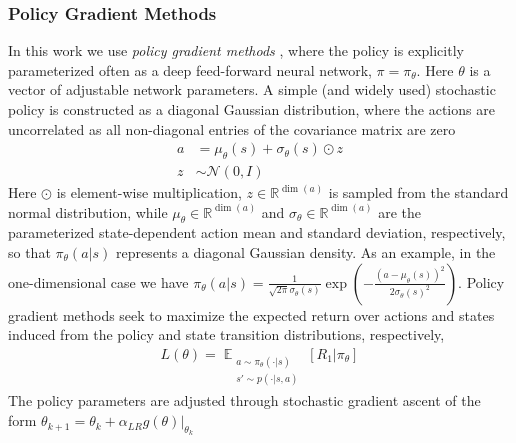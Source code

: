 \documentclass{UnderReview}
\DeclareMathOperator*{\E}{\mathbb{E}}
\begin{document}
\subsubsection{Policy Gradient Methods}\label{section:pg_methods}
In this work we use \textit{policy gradient methods} \cite{peters2006policy}, where the policy is explicitly parameterized often as a deep feed-forward neural network, $\pi=\pi_\theta$. Here $\theta$ is a vector of adjustable network parameters.  A simple (and widely used) stochastic policy is constructed as a diagonal Gaussian distribution, where the actions are uncorrelated as all non-diagonal entries of the covariance matrix are zero
\begin{equation}\label{eq:GaussianPolicy}
	\begin{aligned}
		a &= \mu_\theta(s) + \sigma_\theta(s) \odot z \\
		z &\sim \mathcal{N}(0,I)
	\end{aligned}
\end{equation}
Here $\odot$ is element-wise multiplication, $z \in\mathbb{R}^{\dim(a)}$ is sampled from the standard normal distribution, while $\mu_\theta\in\mathbb{R}^{\dim(a)}$ and $\sigma_\theta \in\mathbb{R}^{\dim(a)}$ are the parameterized state-dependent action mean and standard deviation, respectively, so that $\pi_\theta(a|s)$ represents a diagonal Gaussian density. As an example, in the one-dimensional case we have $\pi_\theta(a|s)=\frac{1}{\sqrt{2\pi}\sigma_\theta(s)} \exp\left(-\frac{(a-\mu_\theta(s))^2}{2\sigma_\theta(s)^2}\right)$.   Policy gradient methods seek to maximize the expected return over actions and states induced from the policy and state transition distributions, respectively,
\begin{equation}
	\begin{aligned}
		L(\theta) = \E_{\substack{a\sim\pi_\theta(\cdot|s) \\ s'\sim p(\cdot|s,a)}} \left[R_1|\pi_\theta\right]
	\end{aligned}
\end{equation}
The policy parameters are adjusted through stochastic gradient ascent of the form $\theta_{k+1} = \theta_k + \alpha_{LR} \hat{g}(\theta)|_{\theta_k}$
\end{document}
